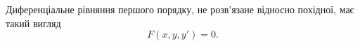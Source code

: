 Диференціальне рівняння першого порядку, не розв’язане відносно похідної, має такий вигляд
\begin{equation*}
	F(x, y, y') = 0. 	
\end{equation*}
